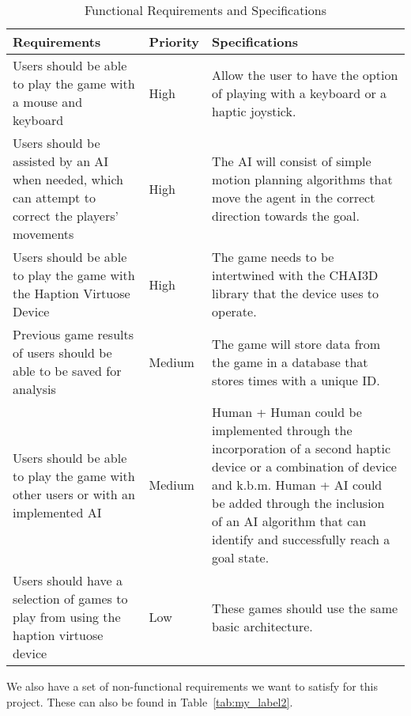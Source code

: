 \documentclass[a4paper]{article}
\begin{document}
\begin{table}[H]
    \centering
    \begin{tabular}{|p{5.5cm}|p{2cm}|p{5.5cm}|}
        \hline
        Requirements & Priority & Specifications  \\
        \hline
        Users should be able to play the game with a mouse and keyboard & 
        \cellcolor[HTML]{FF9999} High &
        Allow the user to have the option of playing with a keyboard or a haptic joystick.  \\
        \hline
        Users should be assisted by an AI when needed, which can attempt to correct the players’ movements &
        \cellcolor[HTML]{FF9999} High &
        The AI will consist of simple motion planning algorithms that move the agent in the correct direction towards the goal. \\
        \hline
        Users should be able to play the game with the Haption Virtuose Device &
        \cellcolor[HTML]{FF9999} High &
        The game needs to be intertwined with the CHAI3D library that the device uses to operate. \\
        \hline
        Previous game results of users should be able to be saved for analysis &
        \cellcolor[HTML]{FFFF99} Medium &
        The game will store data from the game in a database that stores times with a unique ID. \\
        \hline
        Users should be able to play the game with other users or with an implemented AI &
        \cellcolor[HTML]{FFFF99} Medium &
        Human + Human could be implemented through the incorporation of a second haptic device or a combination of device and k.b.m. Human + AI could be added through the inclusion of an AI algorithm that can identify and successfully reach a goal state. \\
        \hline
        Users should have a selection of games to play from using the haption virtuose device &
        \cellcolor[HTML]{CCFF99} Low &
        These games should use the same basic architecture. \\
        \hline
    \end{tabular}
    \caption{Functional Requirements and Specifications}
    \label{tab:my_label1}
\end{table}

We also have a set of non-functional requirements we want to satisfy for this project. These can also be found in Table~\ref{tab:my_label2}.
\end{document}
